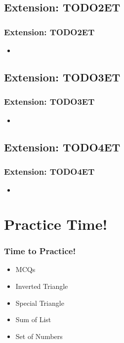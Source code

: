 \documentclass{beamer}
\begin{document}
\subsection{Extension: TODO2ET}
\begin{frame}
    \frametitle{Extension: TODO2ET}
    \begin{itemize}
        \item
    \end{itemize}
\end{frame}
\subsection{Extension: TODO3ET}
\begin{frame}
    \frametitle{Extension: TODO3ET}
    \begin{itemize}
        \item
    \end{itemize}
\end{frame}
\subsection{Extension: TODO4ET}
\begin{frame}
    \frametitle{Extension: TODO4ET}
    \begin{itemize}
        \item
    \end{itemize}
\end{frame}

\section{Practice Time!}
\begin{frame}
    \frametitle{Time to Practice!}
    \begin{itemize}
        \item MCQs
        \item Inverted Triangle
        \item Special Triangle
        \item Sum of List
        \item Set of Numbers
    \end{itemize}
\end{frame}
\end{document}
